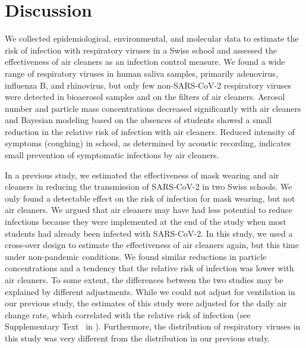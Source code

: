 \documentclass[fleqn,11pt]{wlscirep}
\begin{document}
\FloatBarrier

\newpage

\section{Discussion}


We collected epidemiological, environmental, and molecular data to estimate the risk of infection with respiratory viruses in a Swiss school and assessed the effectiveness of air cleaners as an infection control measure. We found a wide range of respiratory viruses in human saliva samples, primarily adenovirus, influenza B, and rhinovirus, but only few non-SARS-CoV-2 respiratory viruses were detected in bioaerosol samples and on the filters of air cleaners. Aerosol number and particle mass concentrations decreased significantly with air cleaners and Bayesian modeling based on the absences of students showed a small reduction in the relative risk of infection with air cleaners. Reduced intensity of symptoms (coughing) in school, as determined by acoustic recording, indicates small prevention of symptomatic infections by air cleaners.


In a previous study\cite{Banholzer2023PLoSMed}, we estimated the effectiveness of mask wearing and air cleaners in reducing the transmission of SARS-CoV-2 in two Swiss schools. We only found a detectable effect on the risk of infection for mask wearing, but not air cleaners. We argued that air cleaners may have had less potential to reduce infections because they were implemented at the end of the study when most students had already been infected with SARS-CoV-2. In this study, we used a cross-over design to estimate the effectiveness of air cleaners again, but this time under non-pandemic conditions. We found similar reductions in particle concentrations and a tendency that the relative risk of infection was lower with air cleaners. To some extent, the differences between the two studies may be explained by different adjustments. While we could not adjust for ventilation in our previous study, the estimates of this study were adjusted for the daily air change rate, which correlated with the relative risk of infection (see Supplementary Text~ in \supp). Furthermore, the distribution of respiratory viruses in this study was very different from the distribution in our previous study. 
\end{document}
